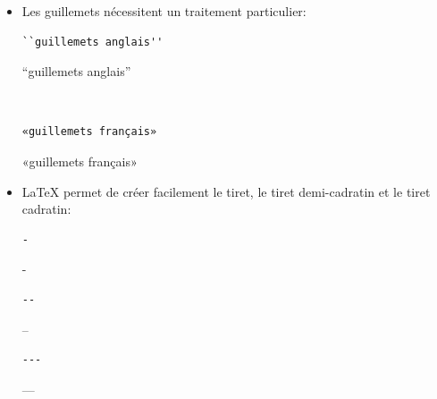 \begin{itemize}
\begin{demo}
\begin{minipage}{0.3\linewidth}
      \begin{texample}
\begin{lstlisting}
\}
\end{lstlisting}
        \producing\}
      \end{texample}
    \end{minipage}
  \end{demo}
%
\item Les guillemets nécessitent un traitement particulier:
  \begin{demo}
    \begin{texample}
\begin{lstlisting}[escapeinside={}]
``guillemets anglais''
\end{lstlisting}
      \producing
      ``guillemets anglais''
    \end{texample} \\
    \begin{texample}
\begin{lstlisting}
«guillemets français»
\end{lstlisting}
      \producing
      «guillemets français»
    \end{texample}
  \end{demo}
%
\item {\LaTeX} permet de créer facilement le tiret, le tiret
  demi-cadratin et le tiret cadratin:
  \begin{demo}
    \begin{minipage}{0.3\linewidth}
      \begin{texample}
\begin{lstlisting}
-
\end{lstlisting}
        \producing
        -
      \end{texample}
    \end{minipage}
    \hfill
    \begin{minipage}{0.3\linewidth}
      \begin{texample}
\begin{lstlisting}
--
\end{lstlisting}
        \producing
        --
      \end{texample}
    \end{minipage}
    \hfill
    \begin{minipage}{0.3\linewidth}
      \begin{texample}
\begin{lstlisting}
---
\end{lstlisting}
        \producing
        ---
      \end{texample}
    \end{minipage}
  \end{demo}
\end{itemize}


